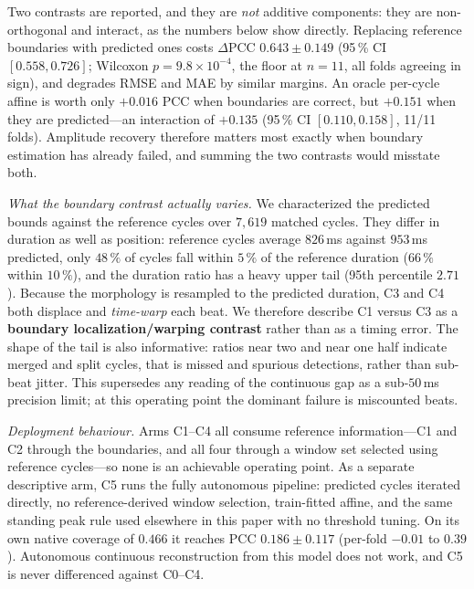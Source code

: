 \documentclass[lettersize,journal]{IEEEtran}
\begin{document}
Two contrasts are reported, and they are \emph{not} additive components: they are non-orthogonal and interact, as the numbers below show directly. Replacing reference boundaries with predicted ones costs $\Delta$PCC $0.643\pm0.149$ (95\,\% CI $[0.558, 0.726]$; Wilcoxon $p = 9.8\times10^{-4}$, the floor at $n=11$, all folds agreeing in sign), and degrades RMSE and MAE by similar margins. An oracle per-cycle affine is worth only $+0.016$ PCC when boundaries are correct, but $+0.151$ when they are predicted---an interaction of $+0.135$ (95\,\% CI $[0.110, 0.158]$, 11/11 folds). Amplitude recovery therefore matters most exactly when boundary estimation has already failed, and summing the two contrasts would misstate both.

\emph{What the boundary contrast actually varies.} We characterized the predicted bounds against the reference cycles over $7{,}619$ matched cycles. They differ in duration as well as position: reference cycles average $826$\,ms against $953$\,ms predicted, only $48\,\%$ of cycles fall within $5\,\%$ of the reference duration ($66\,\%$ within $10\,\%$), and the duration ratio has a heavy upper tail (95th percentile $2.71$). Because the morphology is resampled to the predicted duration, C3 and C4 both displace and \emph{time-warp} each beat. We therefore describe C1 versus C3 as a \textbf{boundary localization/warping contrast} rather than as a timing error. The shape of the tail is also informative: ratios near two and near one half indicate merged and split cycles, that is missed and spurious detections, rather than sub-beat jitter. This supersedes any reading of the continuous gap as a sub-$50$\,ms precision limit; at this operating point the dominant failure is miscounted beats.

\emph{Deployment behaviour.} Arms C1--C4 all consume reference information---C1 and C2 through the boundaries, and all four through a window set selected using reference cycles---so none is an achievable operating point. As a separate descriptive arm, C5 runs the fully autonomous pipeline: predicted cycles iterated directly, no reference-derived window selection, train-fitted affine, and the same standing peak rule used elsewhere in this paper with no threshold tuning. On its own native coverage of $0.466$ it reaches PCC $0.186\pm0.117$ (per-fold $-0.01$ to $0.39$). Autonomous continuous reconstruction from this model does not work, and C5 is never differenced against C0--C4.
\end{document}
